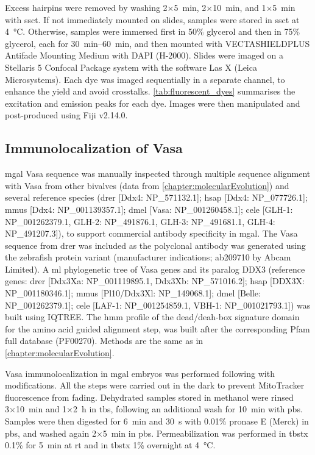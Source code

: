 Excess hairpins were removed by washing 2×\qty{5}{\minute}, 2×\qty{10}{\minute}, and 1×\qty{5}{\minute} with \gls{ssct}. If not immediately mounted on slides, samples were stored in \gls{ssct} at \qty{+4}{\degreeCelsius}. Otherwise, samples were immersed first in 50\% glycerol and then in 75\% glycerol, each for \qtyrange{30}{60}{\minute}, and then mounted with VECTASHIELD\textregistered PLUS Antifade Mounting Medium with DAPI (H-2000). Slides were imaged on a Stellaris 5 Confocal Package system with the software Las X (Leica Microsystems). Each dye was imaged sequentially in a separate channel, to enhance the yield and avoid crosstalks. \cref{tab:fluorescent_dyes} summarises the excitation and emission peaks for each dye. Images were then manipulated and post-produced using Fiji v2.14.0.

\subsection{Immunolocalization of Vasa}
\gls{mgal} Vasa sequence was manually inspected through multiple sequence alignment with Vasa from other bivalves (data from \cref{chapter:molecularEvolution}) and several reference species (\gls{drer} [Ddx4: NP\_571132.1]; \gls{hsap} [Ddx4: NP\_077726.1]; \gls{mmus} [Ddx4: NP\_001139357.1]; \gls{dmel} [Vasa: NP\_001260458.1]; \gls{cele} [GLH-1: NP\_001262379.1, GLH-2: NP\_491876.1, GLH-3: NP\_491681.1, GLH-4: NP\_491207.3]), to support commercial antibody specificity in \gls{mgal}. The Vasa sequence from \gls{drer} was included as the polyclonal antibody was generated using the zebrafish protein variant (manufacturer indications; ab209710 by Abcam Limited). A \gls{ml} phylogenetic tree of Vasa genes and its paralog DDX3 (reference genes:  \gls{drer} [Ddx3Xa: NP\_001119895.1, Ddx3Xb: NP\_571016.2]; \gls{hsap} [DDX3X: NP\_001180346.1]; \gls{mmus} [Pl10/Ddx3Xl: NP\_149068.1]; \gls{dmel} [Belle: NP\_001262379.1]; \gls{cele} [LAF-1: NP\_001254859.1, VBH-1: NP\_001021793.1]) was built using IQTREE. The \gls{hmm} profile of the \gls{dead/deah-box} signature domain for the amino acid guided alignment step, was built after the corresponding Pfam full database (PF00270). Methods are the same as in \cref{chapter:molecularEvolution}. 

Vasa immunolocalization in \gls{mgal} embryos was performed following  with modifications. All the steps were carried out in the dark to prevent MitoTracker fluorescence from fading. Dehydrated samples stored in methanol were rinsed 3×\qty{10}{\minute} and 1×\qty{2}{\hour} in \gls{tbs}, following an additional wash for \qty{10}{\minute} with \gls{pbs}. Samples were then digested for \qty{6}{\minute} and \qty{30}{\second} with 0.01\% pronase E (Merck) in \gls{pbs}, and washed again 2×\qty{5}{\minute} in \gls{pbs}. Permeabilization was performed in \gls{tbstx} 0.1\% for \qty{5}{\minute} at \gls{rt} and in \gls{tbstx} 1\% overnight at \qty{4}{\degreeCelsius}.

